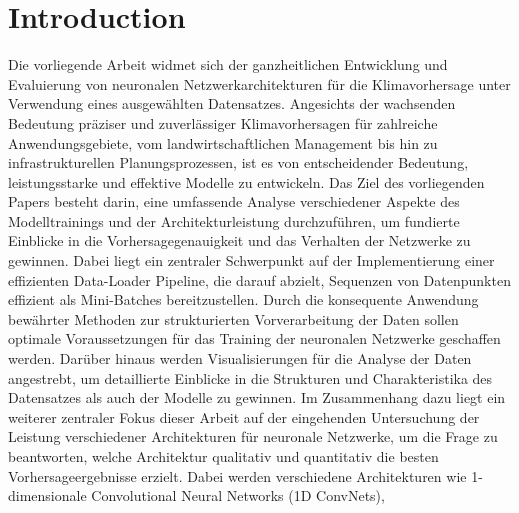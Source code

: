 \documentclass[manuscript,screen,review]{acmart}
\begin{document}

\maketitle

\section{Introduction}
Die vorliegende Arbeit widmet sich der ganzheitlichen Entwicklung 
und Evaluierung von neuronalen Netzwerkarchitekturen für die Klimavorhersage unter Verwendung eines ausgewählten Datensatzes. 
Angesichts der wachsenden Bedeutung präziser und zuverlässiger Klimavorhersagen für zahlreiche Anwendungsgebiete, 
vom landwirtschaftlichen Management bis hin zu infrastrukturellen Planungsprozessen, ist es von entscheidender Bedeutung, 
leistungsstarke und effektive Modelle zu entwickeln.
Das Ziel des vorliegenden Papers besteht darin, eine umfassende Analyse verschiedener Aspekte des Modelltrainings 
und der Architekturleistung durchzuführen, um fundierte Einblicke in die Vorhersagegenauigkeit 
und das Verhalten der Netzwerke zu gewinnen. 
Dabei liegt ein zentraler Schwerpunkt auf der Implementierung einer effizienten Data-Loader Pipeline, 
die darauf abzielt, Sequenzen von Datenpunkten effizient als Mini-Batches bereitzustellen. 
Durch die konsequente Anwendung bewährter Methoden  zur strukturierten Vorverarbeitung der Daten 
sollen optimale Voraussetzungen für das Training der neuronalen Netzwerke geschaffen werden. 
Darüber hinaus werden Visualisierungen für die Analyse der Daten angestrebt, 
um detaillierte Einblicke in die Strukturen und Charakteristika des Datensatzes als auch der Modelle zu gewinnen.
Im Zusammenhang dazu liegt ein weiterer zentraler Fokus dieser Arbeit 
auf der eingehenden Untersuchung der Leistung verschiedener Architekturen für neuronale Netzwerke, 
um die Frage zu beantworten, welche Architektur qualitativ und quantitativ die besten Vorhersageergebnisse erzielt. 
Dabei werden verschiedene Architekturen wie 1-dimensionale Convolutional Neural Networks (1D ConvNets), 
\end{document}
